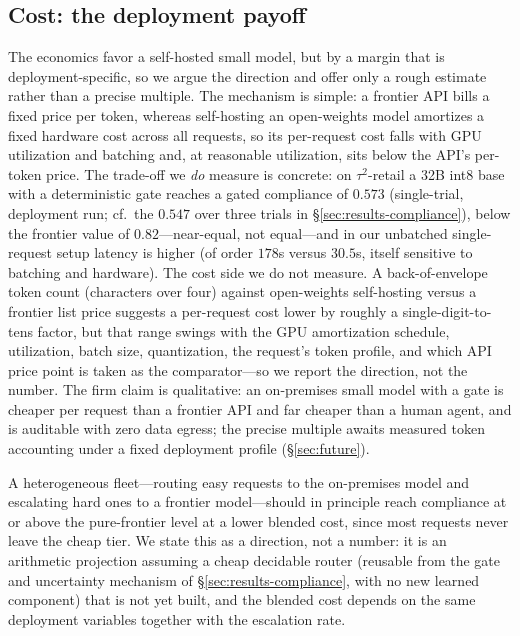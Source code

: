 \subsection{Cost: the deployment payoff}\label{sec:results-cost}%
The economics favor a self-hosted small model, but by a margin that is deployment-specific, so we argue the direction and offer only a rough estimate rather than a precise multiple. The mechanism is simple: a frontier API bills a fixed price per token, whereas self-hosting an open-weights model amortizes a fixed hardware cost across all requests, so its per-request cost falls with GPU utilization and batching and, at reasonable utilization, sits below the API's per-token price. The trade-off we \emph{do} measure is concrete: on $\tau^2$-retail a 32B int8 base with a deterministic gate reaches a gated compliance of $0.573$ (single-trial, deployment run; cf.\ the $0.547$ over three trials in \S\ref{sec:results-compliance}), below the frontier value of $0.82$---near-equal, not equal---and in our unbatched single-request setup latency is higher (of order $178$s versus $30.5$s, itself sensitive to batching and hardware). The cost side we do not measure. A back-of-envelope token count (characters over four) against open-weights self-hosting versus a frontier list price suggests a per-request cost lower by roughly a single-digit-to-tens factor, but that range swings with the GPU amortization schedule, utilization, batch size, quantization, the request's token profile, and which API price point is taken as the comparator---so we report the direction, not the number. The firm claim is qualitative: an on-premises small model with a gate is cheaper per request than a frontier API and far cheaper than a human agent, and is auditable with zero data egress; the precise multiple awaits measured token accounting under a fixed deployment profile (\S\ref{sec:future}).

A heterogeneous fleet---routing easy requests to the on-premises model and escalating hard ones to a frontier model---should in principle reach compliance at or above the pure-frontier level at a lower blended cost, since most requests never leave the cheap tier. We state this as a direction, not a number: it is an arithmetic projection assuming a cheap decidable router (reusable from the gate and uncertainty mechanism of \S\ref{sec:results-compliance}, with no new learned component) that is not yet built, and the blended cost depends on the same deployment variables together with the escalation rate.
